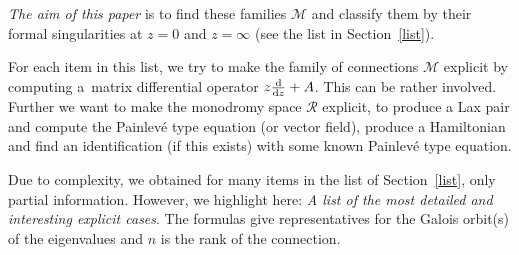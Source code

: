 \documentclass[10pt,a4paper]{amsart}
\numberwithin{equation}{section}
\begin{document}
{\it The aim of this paper} is to find these families $\mathcal{M}$ and classify them by their formal singularities at $z=0$
and $z=\infty$ (see the list in Section~\ref{list}).


For each item in this list, we try to make the family of connections $\mathcal{M}$ explicit by computing a~matrix differential operator
$z\frac{{\rm d}}{{\rm d}z}+A$. This can be rather involved. Further we want to make the monodromy space $\mathcal{R}$
explicit, to produce a Lax pair and compute the Painlev\'e type equation (or vector field), produce a Hamiltonian and find
an identification (if this exists) with some known Painlev\'e type equation.

Due to complexity, we obtained for many items in the list of Section~\ref{list}, only partial information. However,
we highlight here:
 {\it A list of the most detailed and interesting explicit cases}.
 The formulas give representatives for the Galois orbit(s) of the eigenvalues and $n$ is the rank of the connection.
\end{document}
